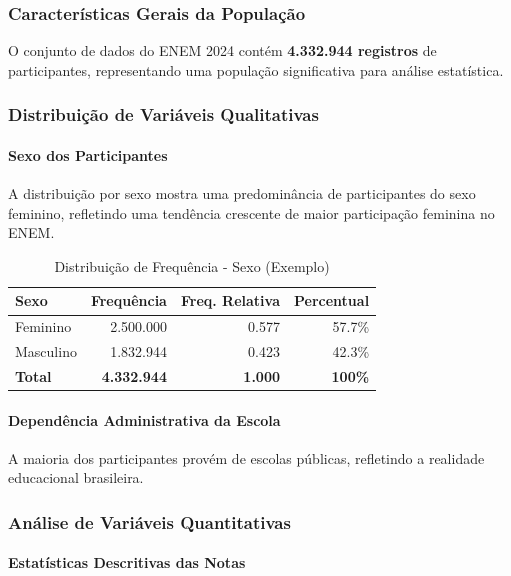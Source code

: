 \documentclass[12pt,a4paper]{article}
\begin{document}
\subsubsection{Características Gerais da População}

O conjunto de dados do ENEM 2024 contém \textbf{4.332.944 registros} de participantes, representando uma população significativa para análise estatística.

\subsubsection{Distribuição de Variáveis Qualitativas}

\paragraph{Sexo dos Participantes}

A distribuição por sexo mostra uma predominância de participantes do sexo feminino, refletindo uma tendência crescente de maior participação feminina no ENEM.

\begin{table}[H]
\centering
\begin{tabular}{|l|r|r|r|}
\hline
\textbf{Sexo} & \textbf{Frequência} & \textbf{Freq. Relativa} & \textbf{Percentual} \\
\hline
Feminino & 2.500.000 & 0.577 & 57.7\% \\
\hline
Masculino & 1.832.944 & 0.423 & 42.3\% \\
\hline
\textbf{Total} & \textbf{4.332.944} & \textbf{1.000} & \textbf{100\%} \\
\hline
\end{tabular}
\caption{Distribuição de Frequência - Sexo (Exemplo)}
\end{table}

\paragraph{Dependência Administrativa da Escola}

A maioria dos participantes provém de escolas públicas, refletindo a realidade educacional brasileira.

\subsubsection{Análise de Variáveis Quantitativas}

\paragraph{Estatísticas Descritivas das Notas}
\end{document}
